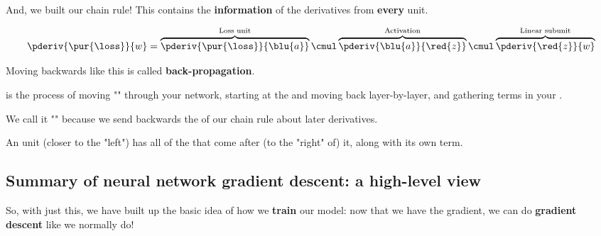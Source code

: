         And, we built our chain rule! This contains the \textbf{information} of the derivatives from \textbf{every} unit.
        
        \begin{equation}
            \pderiv {\pur{\loss}} {w} 
            =
            \overbrace{
                \pderiv {\pur{\loss}} {\blu{a}} 
            }^{\text{Loss unit}}
            \cmul
            \overbrace{
                \pderiv {\blu{a}}     {\red{z}}
            }^{\text{Activation}}
                \cmul
            \overbrace{
                \pderiv {\red{z}}     {w}
            }^{\text{Linear subunit}}
        \end{equation}
        
        Moving backwards like this is called \textbf{back-propagation}.\\
        
        \begin{definition}
             is the process of moving "" through your network, starting at the  and moving back layer-by-layer, and gathering terms in your .
            
            We call it "" because we send backwards the  of our chain rule about later derivatives.
            
            An  unit (closer to the "left") has all of the  that come after (to the "right" of) it, along with its own term.
        \end{definition}
        
    \secdiv
    
    \subsection{Summary of neural network gradient descent: a high-level view}
    
        So, with just this, we have built up the basic idea of how we \textbf{train} our model: now that we have the gradient, we can do \textbf{gradient descent} like we normally do!
            \\
        
